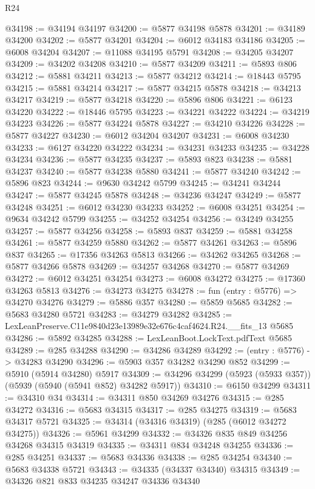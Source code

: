 \begin{lexlean}{R24}
\begin{coremodule}
@34198 := @34194 @34197
@34200 := @5877 @34198 @5878
@34201 := @34189 @34200
@34202 := @5877 @34201
@34204 := @6012 @34183 @34186
@34205 := @6008 @34204
@34207 := @11088 @34195 @5791
@34208 := @34205 @34207
@34209 := @34202 @34208
@34210 := @5877 @34209
@34211 := @5893 @806
@34212 := @5881 @34211
@34213 := @5877 @34212
@34214 := @18443 @5795
@34215 := @5881 @34214
@34217 := @5877 @34215 @5878
@34218 := @34213 @34217
@34219 := @5877 @34218
@34220 := @5896 @806
@34221 := @6123 @34220
@34222 := @18446 @5795
@34223 := @34221 @34222
@34224 := @34219 @34223
@34226 := @5877 @34224 @5878
@34227 := @34210 @34226
@34228 := @5877 @34227
@34230 := @6012 @34204 @34207
@34231 := @6008 @34230
@34233 := @6127 @34220 @34222
@34234 := @34231 @34233
@34235 := @34228 @34234
@34236 := @5877 @34235
@34237 := @5893 @823
@34238 := @5881 @34237
@34240 := @5877 @34238 @5880
@34241 := @5877 @34240
@34242 := @5896 @823
@34244 := @9630 @34242 @5799
@34245 := @34241 @34244
@34247 := @5877 @34245 @5878
@34248 := @34236 @34247
@34249 := @5877 @34248
@34251 := @6012 @34230 @34233
@34252 := @6008 @34251
@34254 := @9634 @34242 @5799
@34255 := @34252 @34254
@34256 := @34249 @34255
@34257 := @5877 @34256
@34258 := @5893 @837
@34259 := @5881 @34258
@34261 := @5877 @34259 @5880
@34262 := @5877 @34261
@34263 := @5896 @837
@34265 := @17356 @34263 @5813
@34266 := @34262 @34265
@34268 := @5877 @34266 @5878
@34269 := @34257 @34268
@34270 := @5877 @34269
@34272 := @6012 @34251 @34254
@34273 := @6008 @34272
@34275 := @17360 @34263 @5813
@34276 := @34273 @34275
@34278 := fun (entry : @5776) => @34270 @34276
@34279 := @5886 @357
@34280 := @5859 @5685
@34282 := @5683 @34280 @5721
@34283 := @34279 @34282
@34285 := LexLeanPreserve.C11e9840d23e13989e32e676c4caf4624.R24.__fits_13 @5685
@34286 := @5892 @34285
@34288 := LexLeanBoot.LockText.pdfText @5685
@34289 := @285 @34288
@34290 := @34286 @34289
@34292 := (entry : @5776) -> @34283 @34290
@34296 := @5903 @357 @34282 @34290 @852
@34299 := @5910 (@5914 @34280) @5917
@34309 := @34296 @34299 (@5923 (@5933 @357)) (@5939 (@5940 (@5941 @852) @34282 @5917))
@34310 := @6150 @34299
@34311 := @34310 @34
@34314 := @34311 @850 @34269 @34276
@34315 := @285 @34272
@34316 := @5683 @34315
@34317 := @285 @34275
@34319 := @5683 @34317 @5721
@34325 := @34314 (@34316 @34319) (@285 (@6012 @34272 @34275))
@34326 := @5961 @34299
@34332 := @34326 @835 @849 @34256 @34268 @34315 @34319
@34335 := @34311 @834 @34248 @34255
@34336 := @285 @34251
@34337 := @5683 @34336
@34338 := @285 @34254
@34340 := @5683 @34338 @5721
@34343 := @34335 (@34337 @34340) @34315
@34349 := @34326 @821 @833 @34235 @34247 @34336 @34340

\end{coremodule}
\end{lexlean}
